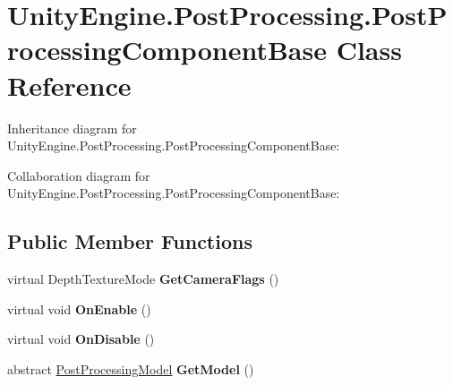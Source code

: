 \hypertarget{class_unity_engine_1_1_post_processing_1_1_post_processing_component_base}{}\section{Unity\+Engine.\+Post\+Processing.\+Post\+Processing\+Component\+Base Class Reference}
\label{class_unity_engine_1_1_post_processing_1_1_post_processing_component_base}


Inheritance diagram for Unity\+Engine.\+Post\+Processing.\+Post\+Processing\+Component\+Base\+:


Collaboration diagram for Unity\+Engine.\+Post\+Processing.\+Post\+Processing\+Component\+Base\+:
\subsection*{Public Member Functions}
\begin{DoxyCompactItemize}
\item 
\mbox{\label{class_unity_engine_1_1_post_processing_1_1_post_processing_component_base_ac381619e1d1a3781fb4183badc0e7b18}} 
virtual Depth\+Texture\+Mode {\bfseries Get\+Camera\+Flags} ()
\item 
\mbox{\label{class_unity_engine_1_1_post_processing_1_1_post_processing_component_base_aff2b95b21422cfffb5a0542d2cd23e08}} 
virtual void {\bfseries On\+Enable} ()
\item 
\mbox{\label{class_unity_engine_1_1_post_processing_1_1_post_processing_component_base_a66da5b84f9e06315b95183a12cc2f10c}} 
virtual void {\bfseries On\+Disable} ()
\item 
\mbox{\label{class_unity_engine_1_1_post_processing_1_1_post_processing_component_base_a83558500b9f9bf231f57bffee50062ea}} 
abstract \hyperlink{class_unity_engine_1_1_post_processing_1_1_post_processing_model}{Post\+Processing\+Model} {\bfseries Get\+Model} ()
\end{DoxyCompactItemize}
